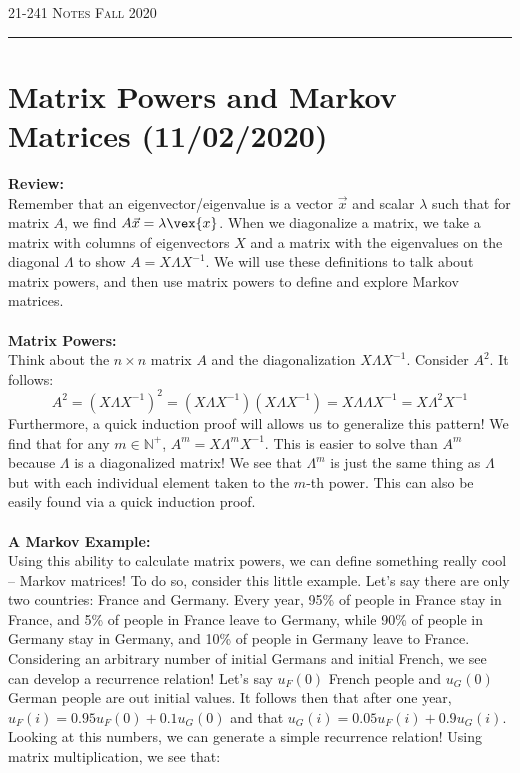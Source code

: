 \documentclass[12pt]{amsart}
\begin{document}
\thispagestyle{empty}

{\scshape 21-241} \hfill {\scshape \Large Notes} \hfill {\scshape Fall 2020}
\medskip
\hrule
\bigskip

\section*{Matrix Powers and Markov Matrices (11/02/2020)}
\textbf{Review:}\\
Remember that an eigenvector/eigenvalue is a vector $\vec{x}$ and scalar $\lambda$ such that for matrix $A$, we find $A\vec{x}=\lambda \vex{x}$. When we diagonalize a matrix, we take a matrix with columns of eigenvectors $X$ and a matrix with the eigenvalues on the diagonal $\Lambda$ to show $A=X\Lambda X^{-1}$. We will use these definitions to talk about matrix powers, and then use matrix powers to define and explore Markov matrices.
\\ \\
\textbf{Matrix Powers:}\\
Think about the $n \times n$ matrix $A$ and the diagonalization $X\Lambda X^{-1}$. Consider $A^2$. It follows:
\[A^2 = (X\Lambda X^{-1})^2 = (X\Lambda X^{-1})(X\Lambda X^{-1}) = X\Lambda\Lambda X^{-1} = X\Lambda^2 X^{-1}\]
Furthermore, a quick induction proof will allows us to generalize this pattern! We find that for any $m \in \mathbb{N}^+$, $A^m = X\Lambda^m X^{-1}$. This is easier to solve than $A^m$ because $\Lambda$ is a diagonalized matrix! We see that $\Lambda^m$ is just the same thing as $\Lambda$ but with each individual element taken to the $m$-th power. This can also be easily found via a quick induction proof.
\\ \\
\textbf{A Markov Example:}\\
Using this ability to calculate matrix powers, we can define something really cool -- Markov matrices! To do so, consider this little example. Let's say there are only two countries: France and Germany. Every year, 95\% of people in France stay in France, and 5\% of people in France leave to Germany, while 90\% of people in Germany stay in Germany, and 10\% of people in Germany leave to France. Considering an arbitrary number of initial Germans and initial French, we see can develop a recurrence relation! Let's say $u_F(0)$ French people and $u_G(0)$ German people are out initial values. It follows then that after one year, $u_F(i) = 0.95u_F(0) + 0.1u_G(0)$ and that $u_G(i) = 0.05 u_F(i) + 0.9u_G(i)$. Looking at this numbers, we can generate a simple recurrence relation! Using matrix multiplication, we see that:
\end{document}
